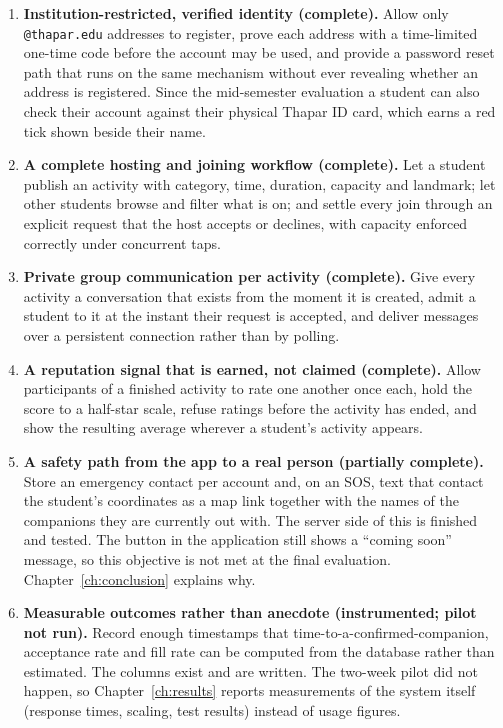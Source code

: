 \documentclass{tietreport}
\begin{document}
\begin{enumerate}
  \item \textbf{Institution-restricted, verified identity (complete).} Allow only
        \texttt{@thapar.edu} addresses to register, prove each address with a
        time-limited one-time code before the account may be used, and provide a
        password reset path that runs on the same mechanism without ever revealing
        whether an address is registered. Since the mid-semester evaluation a student
        can also check their account against their physical Thapar ID card, which
        earns a red tick shown beside their name.

  \item \textbf{A complete hosting and joining workflow (complete).} Let a student
        publish an activity with category, time, duration, capacity and landmark;
        let other students browse and filter what is on; and settle every join
        through an explicit request that the host accepts or declines, with capacity
        enforced correctly under concurrent taps.

  \item \textbf{Private group communication per activity (complete).} Give every
        activity a conversation that exists from the moment it is created, admit a
        student to it at the instant their request is accepted, and deliver messages
        over a persistent connection rather than by polling.

  \item \textbf{A reputation signal that is earned, not claimed (complete).} Allow
        participants of a finished activity to rate one another once each, hold the
        score to a half-star scale, refuse ratings before the activity has ended, and
        show the resulting average wherever a student's activity appears.

  \item \textbf{A safety path from the app to a real person (partially complete).}
        Store an emergency contact per account and, on an SOS, text that contact the
        student's coordinates as a map link together with the names of the companions
        they are currently out with. The server side of this is finished and tested.
        The button in the application still shows a ``coming soon'' message, so this
        objective is not met at the final evaluation. Chapter~\ref{ch:conclusion}
        explains why.

  \item \textbf{Measurable outcomes rather than anecdote (instrumented; pilot not
        run).} Record enough timestamps that time-to-a-confirmed-companion,
        acceptance rate and fill rate can be computed from the database rather than
        estimated. The columns exist and are written. The two-week pilot did not
        happen, so Chapter~\ref{ch:results} reports measurements of the system
        itself (response times, scaling, test results) instead of usage figures.
\end{enumerate}
\end{document}
